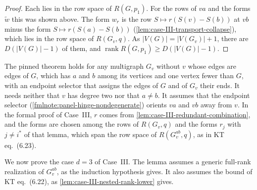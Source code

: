 \begin{proof}
  Each lies in the row space of $R(G, p_1)$. For the rows of $va$ and the
  forms $\tilde w$ this was shown above. The form $w_r$ is the row
  $S \mapsto r(S(v) - S(b))$ at $vb$ minus the form
  $S \mapsto r(S(a) - S(b))$ (\cref{lem:case-III-transport-collapse}),
  which lies in the row space of $R(G_v, q)$. As
  $|V(G)| = |V(G_v)| + 1$, there are $D(|V(G)| - 1)$ of them, and
  $\operatorname{rank} R(G, p_1) \ge D(|V(G)| - 1)$.
\end{proof}

\begin{fmlnote}
  The pinned theorem holds for any multigraph $G_v$ without $v$ whose
  edges are edges of $G$, which has $a$ and $b$ among its vertices and
  one vertex fewer than $G$, with an endpoint selector that assigns the
  edges of $G$ and of $G_v$ their ends. It needs neither that $v$ has
  degree two nor that $a \neq b$. It assumes that the endpoint selector
  (\cref{fmlnote:panel-hinge-nondegenerate}) orients $va$ and $vb$ away
  from $v$. In the formal proof of Case~III, $r$ comes from
  \cref{lem:case-III-redundant-combination}, and the forms are chosen
  among the rows of $R(G_v, q)$ and the forms $r_j$ with $j \neq i^*$ of
  that lemma, which span the row space of $R(G_v^{ab}, q)$, as in KT
  eq.~(6.23).
\end{fmlnote}

We now prove the case $d = 3$ of Case~III. The lemma assumes a generic
full-rank realization of $G_v^{ab}$, as the induction hypothesis gives.
It also assumes the bound of KT eq.~(6.22), as
\cref{lem:case-III-nested-rank-lower} gives.

